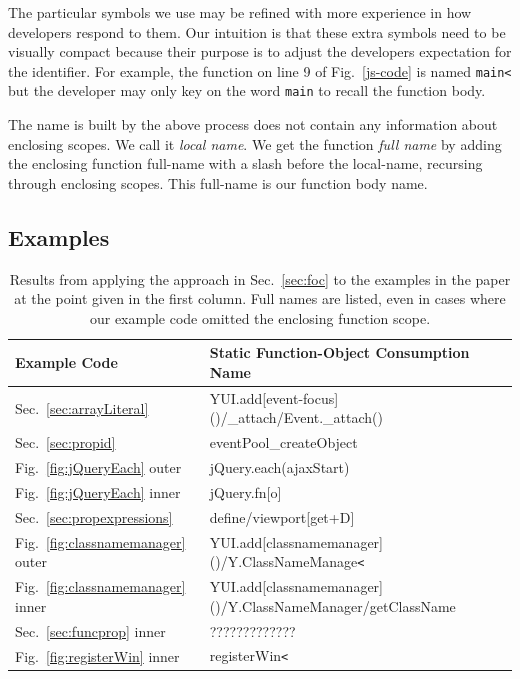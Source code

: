 \documentclass[10pt, preprint]{sigplanconf}
\begin{document}
The particular symbols we use may be refined with more experience in how developers respond to them. Our intuition is that these extra symbols need to be visually compact because their purpose is to adjust the developers expectation for the identifier. For example, the function on line 9 of Fig.~\ref{js-code} is named \texttt{main<} but the developer may only key on the word \texttt{main} to recall the function body. 

The name is built by the above process does not contain any information about enclosing scopes. We call it \textit{local name}. We get the function \textit{full name} by adding the enclosing function full-name with a slash before the local-name, recursing through enclosing scopes. This full-name is our function body name.




\subsection{Examples}
\label{sec:examples}

\begin{table}[tb]
\centering
\begin{tabular}{|l|l|}
\hline
Example Code & Static Function-Object Consumption Name \\
\hline
Sec.~\ref{sec:arrayLiteral} & YUI.add[event-focus]()/\_attach/Event.\_attach() \\
\hline
Sec.~\ref{sec:propid} & eventPool\_createObject \\
\hline
Fig.~\ref{fig:jQueryEach} outer & jQuery.each(ajaxStart) \\
\hline
Fig.~\ref{fig:jQueryEach} inner & jQuery.fn[o] \\
\hline
Sec.~\ref{sec:propexpressions}  & define/viewport[get+D] \\
\hline
Fig.~\ref{fig:classnamemanager} outer & YUI.add[classnamemanager]()/Y.ClassNameManage\verb|<| \\
\hline
Fig.~\ref{fig:classnamemanager} inner & YUI.add[classnamemanager]()/Y.ClassNameManager/getClassName \\
\hline
Sec.~\ref{sec:funcprop} inner & ?????????????\\
\hline
Fig.~\ref{fig:registerWin} inner & registerWin\verb|<| \\
\end{tabular}
\label{table:examples}
\caption{Results from applying the approach in Sec.~\ref{sec:foc} to the examples in the paper at the point given in the first column.
Full names are listed, even in cases where our example code omitted the enclosing function scope.}
\end{table}
\end{document}
